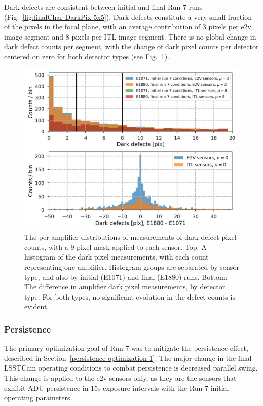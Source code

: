 Dark defects are consistent between initial and final Run 7 runs (Fig.~\ref{fig:finalChar-DarkPix-5x5}). Dark defects constitute a very small fraction of the pixels in the focal plane, with an average contribution of 3 pixels per e2v image segment and 8 pixels per ITL image segment. There is no global change in dark defect counts per segment, with the change of
dark pixel counts per detector centered on zero for both detector types (see Fig.~\ref{fig:finalChar:darkDefectsComparison}).

\begin{figure}[ht]
    \centering
    \includegraphics[width=0.9\linewidth]{figures/finalCharacterization/darkDefects_comparison_final.jpg}
    \caption{The per-amplifier distributions of measurements of dark defect pixel counts, with a 9 pixel mask applied to each sensor. Top: A histogram of the dark pixel measurements, with each count representing one amplifier. Histogram groups are separated by sensor type, and also by initial (E1071) and final (E1880) runs. Bottom: The difference in amplifier dark pixel measurements, by detector type. For both types, no significant evolution in the defect counts is evident.}
    \label{fig:finalChar:darkDefectsComparison}
\end{figure}

\clearpage
\subsubsection{Persistence}\label{final-persistence}

The primary optimization goal of Run 7 was to mitigate the persistence effect, described in Section~\ref{persistence-optimization-1}. The major change in the final LSSTCam operating conditions to combat persistence is decreased parallel swing. This change is applied to the e2v sensors only, as they are the sensors that exhibit  ADU persistence in 15s exposure intervals with the Run 7 initial operating parameters.


